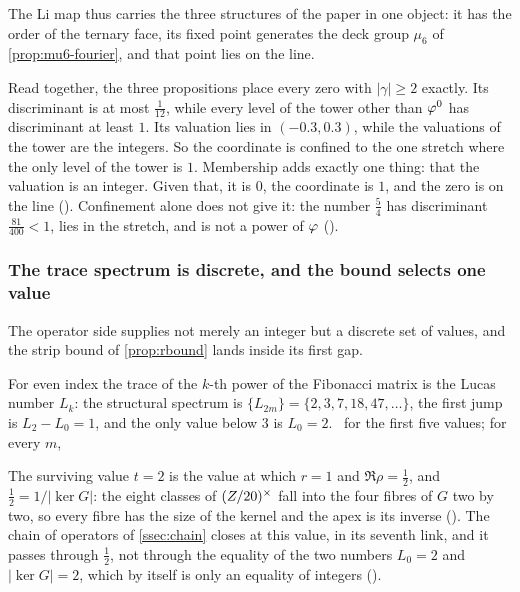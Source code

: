 The Li map thus carries the three structures of the paper in one object: it has the
order of the ternary face, its fixed point generates the deck group $\mu_6$ of
\cref{prop:mu6-fourier}, and that point lies on the line.

\begin{remark}\label{rmk:confined}
Read together, the three propositions place every zero with $|\gamma|\ge2$ exactly.  Its
discriminant is at most $\tfrac1{12}$, while every level of the tower other than
$\varphi^0$ has discriminant at least $1$.  Its valuation lies in $(-0.3,0.3)$, while the
valuations of the tower are the integers.  So the coordinate is confined to the one
stretch where the only level of the tower is $1$.  Membership adds exactly one thing:
that the valuation is an integer.  Given that, it is $0$, the coordinate is $1$, and the
zero is on the line ().  Confinement alone does not give it: the
number $\tfrac54$ has discriminant $\tfrac{81}{400}<1$, lies in the stretch, and is not a
power of $\varphi$ ().
\end{remark}

\subsubsection{The trace spectrum is discrete, and the bound selects one value}\label{ssec:trace-spectrum}

The operator side supplies not merely an integer but a discrete set of values,
and the strip bound of \cref{prop:rbound} lands inside its first gap.

\begin{proposition}\label{prop:lucas-spectrum}
For even index the trace of the $k$-th power of the Fibonacci matrix is the Lucas
number $L_k$: the structural spectrum is $\{L_{2m}\}=\{2,3,7,18,47,\dots\}$, the
first jump is $L_2-L_0=1$, and the only value below $3$ is $L_0=2$.
\ for the first five values;
for every $m$, %
\end{proposition}

\begin{corollary}\label{cor:value-is-kernel}
The surviving value $t=2$ is the value at which $r=1$ and $\Re\rho=\tfrac12$, and
$\tfrac12=1/|\ker G|$: the eight classes of $(Z/20)^{\times}$ fall into the four fibres of $G$
two by two, so every fibre has the size of the kernel and the apex is its inverse
().  The chain of operators of
\cref{ssec:chain} closes at this value, in its seventh link, and it passes through $\tfrac12$, not through the equality of the two numbers
$L_0=2$ and $|\ker G|=2$, which by itself is only an equality of integers
().
\end{corollary}

